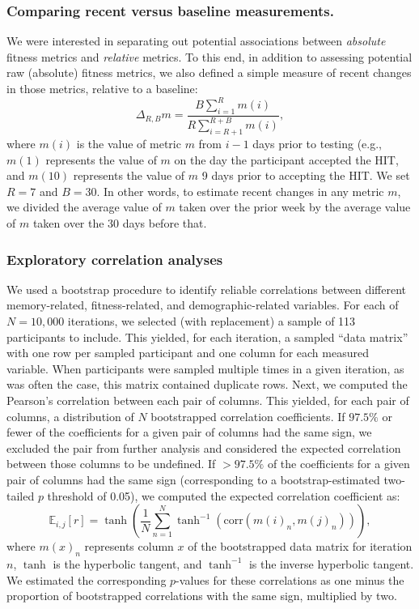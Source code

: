 \documentclass[10pt]{article}
\begin{document}
\subsubsection*{Comparing recent versus baseline measurements.}
We were interested in separating out potential associations between
\textit{absolute} fitness metrics and \textit{relative} metrics.  To
this end, in addition to assessing potential raw (absolute) fitness
metrics, we also defined a simple measure of recent changes in those
metrics, relative to a baseline:
\[
  \Delta_{R, B} m = \frac{B \sum_{i = 1}^R
  m(i)}{R \sum_{i=R + 1}^{R+B}m(i)},
\]
where $m(i)$ is the value of metric $m$ from $i - 1$ days prior to
testing (e.g., $m(1)$ represents the value of $m$ on the day the
participant accepted the HIT, and $m(10)$ represents the value of $m$
9 days prior to accepting the HIT.  We set $R = 7$ and $B = 30$.  In
other words, to estimate recent changes in any metric $m$, we divided
the average value of $m$ taken over the prior week by the average
value of $m$ taken over the 30 days before that.


\subsubsection*{Exploratory correlation analyses}
We used a bootstrap procedure to identify reliable correlations
between different memory-related, fitness-related, and
demographic-related variables.  For each of $N = 10,000$ iterations, we
selected (with replacement) a sample of 113 participants to include.
This yielded, for each iteration, a sampled ``data matrix'' with one
row per sampled participant and one column for each measured variable.
When participants were sampled multiple times in a given iteration, as
was often the case, this matrix contained duplicate rows.  Next, we computed the Pearson's correlation
between each pair of columns.  This yielded, for each pair of columns,
a distribution of $N$ bootstrapped correlation coefficients.  If
$97.5\%$ or fewer of the coefficients for a given pair of columns had the
same sign, we excluded the pair from further analysis and considered
the expected correlation between those columns to be undefined.  If
$> 97.5\%$ of the coefficients for a given pair of columns had the
same sign (corresponding to a bootstrap-estimated two-tailed $p$
threshold of 0.05), we computed the expected correlation coefficient as:
\[
  \mathbb{E}_{i, j}\left[ r\right] = \tanh\left(\frac{1}{N} \sum_{n=1}^N
  \tanh^{-1}(\mathrm{corr}\left(m(i)_n, m(j)_n\right))\right),
\]
where $m(x)_n$ represents column $x$ of the bootstrapped data matrix
for iteration $n$, $\tanh$ is the hyperbolic tangent, and $\tanh^{-1}$
is the inverse hyperbolic tangent.  We estimated the corresponding $p$-values
for these correlations as one minus the proportion of bootstrapped
correlations with the same sign, multiplied by two.
\end{document}
